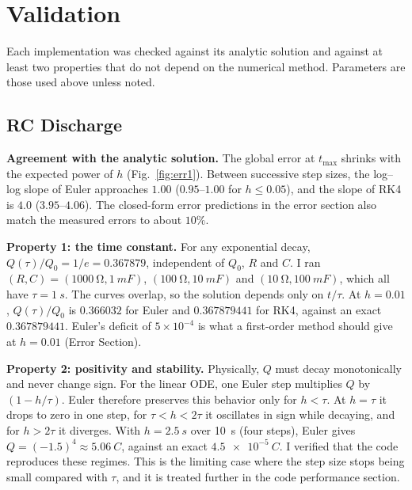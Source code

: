 \documentclass[11pt]{article}
\begin{document}
\section{Validation}

Each implementation was checked against its analytic solution and against at least two properties that do not depend on the numerical method. Parameters are those used above unless noted.

\subsection{RC Discharge}

\textbf{Agreement with the analytic solution.} The global error at $t_{\max}$ shrinks with the expected power of $h$ (Fig.~\ref{fig:err1}). Between successive step sizes, the log--log slope of Euler approaches $1.00$ ($0.95$--$1.00$ for $h \le 0.05$), and the slope of RK4 is $4.0$ ($3.95$--$4.06$). The closed-form error predictions in the error section also match the measured errors to about $10\%$.

\textbf{Property 1: the time constant.} For any exponential decay, $Q(\tau)/Q_0 = 1/e = 0.367879$, independent of $Q_0$, $R$ and $C$. I ran $(R, C) = (\SI{1000}{\ohm}, \SI{1}{mF})$, $(\SI{100}{\ohm}, \SI{10}{mF})$ and $(\SI{10}{\ohm}, \SI{100}{mF})$, which all have $\tau = \SI{1}{s}$. The curves overlap, so the solution depends only on $t/\tau$. At $h = 0.01$, $Q(\tau)/Q_0$ is $0.366032$ for Euler and $0.367879441$ for RK4, against an exact $0.367879441$. Euler's deficit of $5\times10^{-4}$ is what a first-order method should give at $h = 0.01$ (Error Section).

\textbf{Property 2: positivity and stability.} Physically, $Q$ must decay monotonically and never change sign. For the linear ODE, one Euler step multiplies $Q$ by $(1 - h/\tau)$. Euler therefore preserves this behavior only for $h < \tau$. At $h = \tau$ it drops to zero in one step, for $\tau < h < 2\tau$ it oscillates in sign while decaying, and for $h > 2\tau$ it diverges. With $h = \SI{2.5}{s}$ over \SI{10}{s} (four steps), Euler gives $Q = (-1.5)^4 \approx \SI{5.06}{C}$, against an exact $\SI{4.5e-5}{C}$. I verified that the code reproduces these regimes. This is the limiting case where the step size stops being small compared with $\tau$, and it is treated further in the code performance section.
\end{document}
